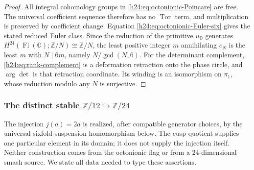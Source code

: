 \begin{proof}
All integral cohomology groups in
\eqref{h24:eq:octonionic-Poincare} are free.  The universal coefficient
sequence therefore has no \(\operatorname{Tor}\) term, and multiplication
is preserved by coefficient change.  Equation
\eqref{h24:eq:octonionic-Euler-six} gives the stated reduced Euler class.
Since the reduction of the primitive \(u_{\mathbb O}\) generates
\(H^{24}(\operatorname{Fl}(\mathbb O);\mathbb Z/N)\cong\mathbb Z/N\), the least positive
integer \(m\) annihilating \(e_N\) is the least \(m\) with \(N\mid6m\),
namely \(N/\gcd(N,6)\).
For the determinant complement,
\eqref{h24:eq:rank-complement} is a deformation retraction onto the phase
circle, and \(\arg\det\) is that retraction coordinate.  Its winding is an
isomorphism on \(\pi_1\), whose reduction modulo any \(N\) is surjective.
\end{proof}

\subsubsection[The distinct stable mod--12-to-mod--24 injection]
{The distinct stable \(\mathbb Z/12\hookrightarrow\mathbb Z/24\)}

The injection \(j(a)=2a\) is realized, after compatible generator choices,
by the universal sixfold suspension homomorphism below.  The cusp quotient
supplies one particular element in its domain; it does not supply the
injection itself.  Neither construction comes from the octonionic flag or
from a \(24\)-dimensional smash source.  We state all data needed to type
these assertions.

